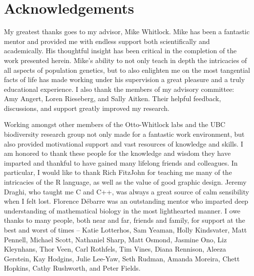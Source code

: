 \chapter*{Acknowledgements}

My greatest thanks goes to my advisor, Mike Whitlock. Mike has been a fantastic mentor and provided me with endless support both scientifically and academically. His thoughtful insight has been critical in the completion of the work presented herein. Mike's ability to not only teach in depth the intricacies of all aspects of population genetics, but to also enlighten me on the most tangential facts of life has made working under his supervision a great pleasure and a truly educational experience. I also thank the members of my advisory committee: Amy Angert, Loren Rieseberg, and Sally Aitken. Their helpful feedback, discussions, and support greatly improved my research.

Working amongst other members of the Otto-Whitlock labs and the UBC biodiversity research group not only made for a fantastic work environment, but also provided motivational support and vast resources of knowledge and skills. I am honored to thank these people for the knowledge and wisdom they have imparted and thankful to have gained many lifelong friends and colleagues. In particular, I would like to thank Rich FitzJohn for teaching me many of the intricacies of the R language, as well as the value of good graphic design. Jeremy Draghi, who taught me C and C++, was always a great source of calm sensibility when I felt lost. Florence D\'ebarre was an outstanding mentor who imparted deep understanding of mathematical biology in the most lighthearted manner. I owe thanks to many people, both near and far, friends and family, for support at the best and worst of times -- Katie Lotterhos, Sam Yeaman, Holly Kindsvater, Matt Pennell, Michael Scott, Nathaniel Sharp, Matt Osmond, Jasmine Ono, Liz Kleynhans, Thor Veen, Carl Rothfels, Tim Vines, Diana Rennison, Aleeza Gerstein, Kay Hodgins, Julie Lee-Yaw, Seth Rudman, Amanda Moreira, Chett Hopkins, Cathy Rushworth, and Peter Fields.

